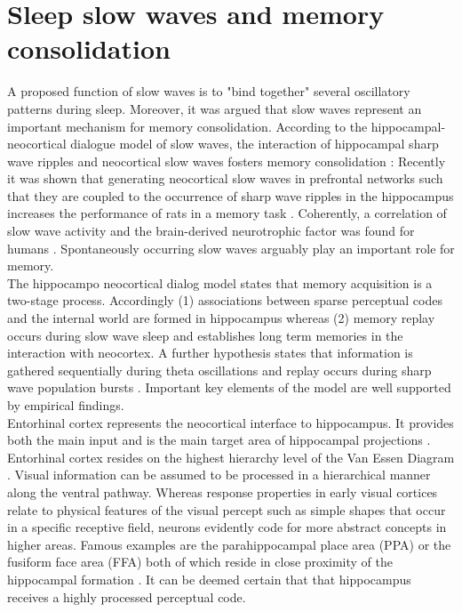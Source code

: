 \section{Sleep slow waves and memory consolidation}
\label{slow_waves_and_memory}
A proposed function of slow waves is to "bind together" \parencite[1110]{brown2012control} several oscillatory patterns during sleep. Moreover, it was argued that slow waves represent an important mechanism for memory consolidation. According to the hippocampal-neocortical dialogue model of slow waves, the interaction of hippocampal sharp wave ripples and neocortical slow waves fosters memory consolidation \parencite{buzsaki1996hippocampo}: Recently it was shown that generating neocortical slow waves in prefrontal networks such that they are coupled to the occurrence of sharp wave ripples in the hippocampus increases the performance of rats in a memory task \parencite{maingret2016hippocampo}. Coherently, a correlation of slow wave activity and the brain-derived neurotrophic factor was found for humans \parencite{duncan2013concomitant}. Spontaneously occurring slow waves arguably play an important role for memory.\\
The hippocampo neocortical dialog model states that memory acquisition is a two-stage process. Accordingly (1) associations between sparse perceptual codes and the internal world are formed in hippocampus whereas (2) memory replay occurs during slow wave sleep and establishes long term memories in the interaction with neocortex. A further hypothesis states that information is gathered sequentially during theta oscillations and replay occurs during sharp wave population bursts \parencite{buzsaki1996hippocampo}. Important key elements of the model are well supported by empirical findings.\\
Entorhinal cortex represents the neocortical interface to hippocampus. It provides both the main input and is the main target area of hippocampal projections \parencite{buzsaki1996hippocampo}. Entorhinal cortex resides on the highest hierarchy level of the Van Essen Diagram \parencite{felleman1991distributed}. Visual information can be assumed to be processed in a hierarchical manner along the ventral pathway. Whereas response properties in early visual cortices relate to physical features of the visual percept such as simple shapes that occur in a specific receptive field, neurons evidently code for more abstract concepts in higher areas. Famous examples are the parahippocampal place area (PPA) or the fusiform face area (FFA) both of which reside in close proximity of the hippocampal formation \parencite{coggan2019selectivity}. It can be deemed certain that that hippocampus receives a highly processed perceptual code.\\
